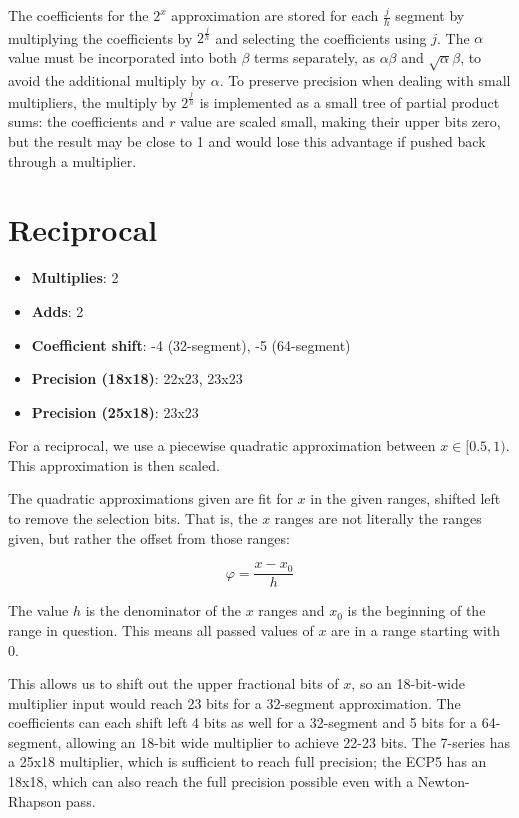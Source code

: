 The coefficients for the $2^x$ approximation are stored for each $\frac{j}{h}$ segment by multiplying the coefficients by $2^{\frac{j}{h}}$ and selecting the coefficients using $j$.  The $\alpha$ value must be incorporated into both $\beta$ terms separately, as $\alpha\beta$ and $\sqrt{\alpha}\beta$, to avoid the additional multiply by $\alpha$.  To preserve precision when dealing with small multipliers, the multiply by $2^\frac{j}{h}$ is implemented as a small tree of partial product sums:  the coefficients and $r$ value are scaled small, making their upper bits zero, but the result may be close to 1 and would lose this advantage if pushed back through a multiplier.

\section{Reciprocal}

\begin{itemize}
	\item \textbf{Multiplies}:  2
	\item \textbf{Adds}: 2
	\item \textbf{Coefficient shift}:  -4 (32-segment), -5 (64-segment)
	\item \textbf{Precision (18x18)}:  22x23, 23x23
	\item \textbf{Precision (25x18)}:  23x23
\end{itemize}


For a reciprocal, we use a piecewise quadratic approximation between $x\in[0.5,1)$.  This approximation is then scaled.

The quadratic approximations given are fit for $x$ in the given ranges, shifted left to remove the selection bits.  That is, the $x$ ranges are not literally the ranges given, but rather the offset from those ranges:

\begin{equation*}
	\varphi = \frac{x - x_0}{h}
\end{equation*}

The value $h$ is the denominator of the $x$ ranges and $x_0$ is the beginning of the range in question.  This means all passed values of $x$ are in a range starting with 0.

This allows us to shift out the upper fractional bits of $x$, so an 18-bit-wide multiplier input would reach 23 bits for a 32-segment approximation.  The coefficients can each shift left 4 bits as well for a 32-segment and 5 bits for a 64-segment, allowing an 18-bit wide multiplier to achieve 22-23 bits.  The 7-series has a 25x18 multiplier, which is sufficient to reach full precision; the ECP5 has an 18x18, which can also reach the full precision possible even with a Newton-Rhapson pass.

